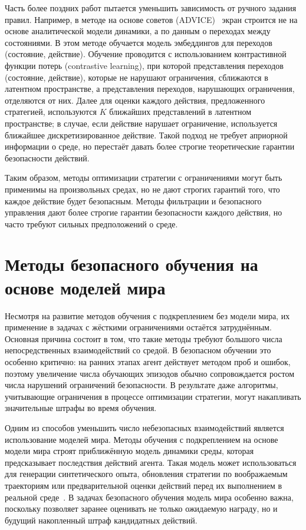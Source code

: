 Часть более поздних работ пытается уменьшить зависимость от ручного задания правил. Например, в методе на основе советов (ADVICE)~\cite{advice} экран строится не на основе аналитической модели динамики, а по данным о переходах между состояниями. В этом методе обучается модель эмбеддингов для переходов (состояние, действие). Обучение проводится с использованием контрастивной функции потерь (contrastive learning), при которой представления переходов (состояние, действие), которые не нарушают ограничения, сближаются в латентном пространстве, а представления переходов, нарушающих ограничения, отделяются от них. Далее для оценки каждого действия, предложенного стратегией, используются $K$ ближайших представлений в латентном пространстве; в случае, если действие нарушает ограничение, используется ближайшее дискретизированное действие. Такой подход не требует априорной информации о среде, но перестаёт давать более строгие теоретические гарантии безопасности действий.

Таким образом, методы оптимизации стратегии с ограничениями могут быть применимы на произвольных средах, но не дают строгих гарантий того, что каждое действие будет безопасным. Методы фильтрации и безопасного управления дают более строгие гарантии безопасности каждого действия, но часто требуют сильных предположений о среде.

\section{Методы безопасного обучения на основе моделей мира}
\label{subsec:safe_mbrl}

Несмотря на развитие методов обучения с подкреплением без модели мира, их применение в задачах с жёсткими ограничениями остаётся затруднённым. Основная причина состоит в том, что такие методы требуют большого числа непосредственных взаимодействий со средой. В безопасном обучении это особенно критично: на ранних этапах агент действует методом проб и ошибок, поэтому увеличение числа обучающих эпизодов обычно сопровождается ростом числа нарушений ограничений безопасности. В результате даже алгоритмы, учитывающие ограничения в процессе оптимизации стратегии, могут накапливать значительные штрафы во время обучения.

Одним из способов уменьшить число небезопасных взаимодействий является использование моделей мира. Методы обучения с подкреплением на основе модели мира строят приближённую модель динамики среды, которая предсказывает последствия действий агента. Такая модель может использоваться для генерации синтетического опыта, обновления стратегии по воображаемым траекториям или предварительной оценки действий перед их выполнением в реальной среде~\cite{polydoros2017survey,moerland2023model}. В задачах безопасного обучения модель мира особенно важна, поскольку позволяет заранее оценивать не только ожидаемую награду, но и будущий накопленный штраф кандидатных действий.

